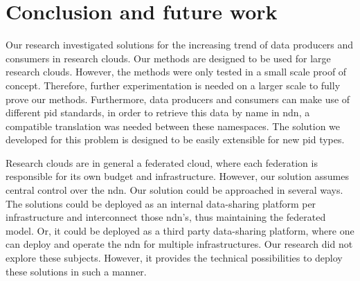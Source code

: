 \section{Conclusion and future work}
\label{fut}
\label{conc}












Our research investigated solutions for the increasing trend of data producers and consumers in research clouds. Our methods are designed to be used for large research clouds. However, the methods were only tested in a small scale proof of concept. Therefore, further experimentation is needed on a larger scale to fully prove our methods. Furthermore, data producers and consumers can make use of different \gls{pid} standards, in order to retrieve this data by name in \gls{ndn}, a compatible translation was needed between these namespaces. The solution we developed for this problem is designed to be easily extensible for new \gls{pid} types. 

Research clouds are in general a federated cloud, where each federation is responsible for its own budget and infrastructure. However, our solution assumes central control over the \gls{ndn}. Our solution could be approached in several ways. The solutions could be deployed as an internal data-sharing platform per infrastructure and interconnect those \gls{ndn}'s, thus maintaining the federated model. Or, it could be deployed as a third party data-sharing platform, where one can deploy and operate the \gls{ndn} for multiple infrastructures. Our research did not explore these subjects. However, it provides the technical possibilities to deploy these solutions in such a manner.


